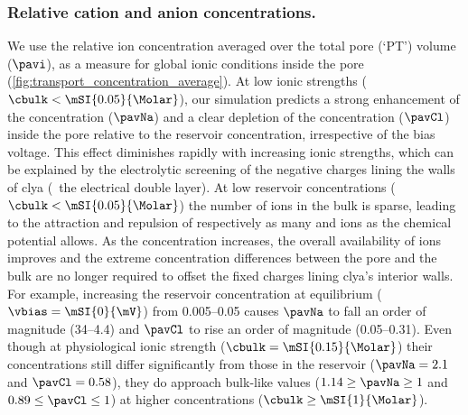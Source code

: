 \subsubsection{Relative cation and anion concentrations.}
%

We use the relative ion concentration averaged over the total pore (`PT') volume ($\pavi$), as a measure for
global ionic conditions inside the pore (\cref{fig:transport_concentration_average}). At low ionic strengths
($\cbulk < \mSI{0.05}{\Molar}$), our simulation predicts a strong enhancement of the \Na{} concentration
($\pavNa$) and a clear depletion of the \Cl{} concentration ($\pavCl$) inside the pore relative to the
reservoir concentration, irrespective of the bias voltage. This effect diminishes rapidly with increasing
ionic strengths, which can be explained by the electrolytic screening of the negative charges lining the walls
of \gls{clya} (\ie~the electrical double layer). At low reservoir concentrations ($\cbulk <
\mSI{0.05}{\Molar}$) the number of ions in the bulk is sparse, leading to the attraction and repulsion of
respectively as many \Na{} and \Cl{} ions as the chemical potential allows. As the concentration increases,
the overall availability of ions improves and the extreme concentration differences between the pore and the
bulk are no longer required to offset the fixed charges lining \gls{clya}'s interior walls. For example,
increasing the reservoir concentration at equilibrium ($\vbias = \mSI{0}{\mV}$) from
\SIrange{0.005}{0.05}{\Molar} causes $\pavNa$ to fall an order of magnitude (\numrange{34}{4.4}) and $\pavCl$
to rise an order of magnitude (\numrange{0.05}{0.31}). Even though  at physiological ionic strength ($\cbulk =
\mSI{0.15}{\Molar}$) their concentrations still differ significantly from those in the reservoir ($\pavNa =
2.1$ and $\pavCl = 0.58$), they do approach bulk-like values ($1.14 \ge \pavNa \ge 1$ and $0.89 \le \pavCl \le
1$) at higher concentrations ($\cbulk \ge \mSI{1}{\Molar}$).

